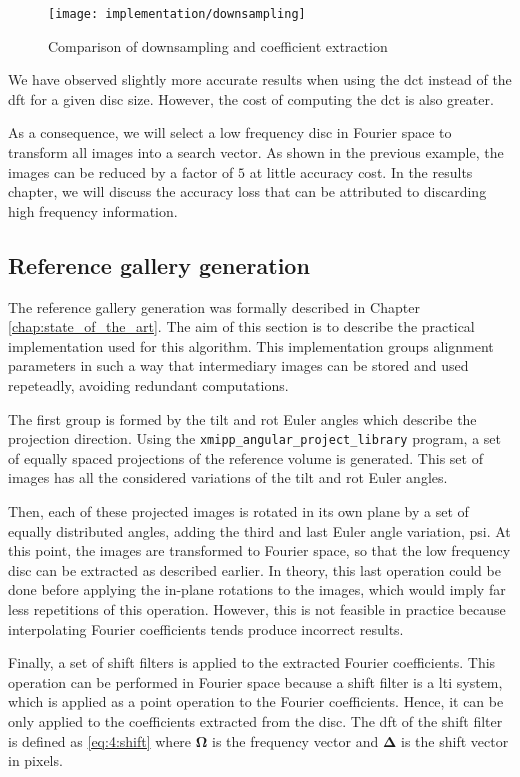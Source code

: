 \documentclass[../main.tex]{subfiles}
\begin{document}
\begin{figure}[htbp]
    \centering
    \texttt{[image: implementation/downsampling]}
    \caption{Comparison of downsampling and coefficient extraction}
    \label{fig:4:downsampling}
\end{figure}

We have observed slightly more accurate results when using the \gls{dct} instead of the \gls{dft} for a given disc size. However, the cost of computing the \gls{dct} is also greater.

As a consequence, we will select a low frequency disc in Fourier space to transform all images into a search vector. As shown in the previous example, the images can be reduced by a factor of $5$ at little accuracy cost. In the results chapter, we will discuss the accuracy loss that can be attributed to discarding high frequency information.

\subsection{Reference gallery generation}
The reference gallery generation was formally described in Chapter \ref{chap:state_of_the_art}. The aim of this section is to describe the practical implementation used for this algorithm. This implementation groups alignment parameters in such a way that intermediary images can be stored and used repeteadly, avoiding redundant computations.

The first group is formed by the tilt and rot Euler angles which describe the projection direction. Using the \texttt{xmipp\_angular\_project\_library}\cite{sorzano2004} program, a set of equally spaced projections of the reference volume is generated. This set of images has all the considered variations of the tilt and rot Euler angles.

Then, each of these projected images is rotated in its own plane by a set of equally distributed angles, adding the third and last Euler angle variation, psi. At this point, the images are transformed to Fourier space, so that the low frequency disc can be extracted as described earlier. In theory, this last operation could be done before applying the in-plane rotations to the images, which would imply far less repetitions of this operation. However, this is not feasible in practice because interpolating Fourier coefficients tends produce incorrect results.

Finally, a set of shift filters is applied to the extracted Fourier coefficients. This operation can be performed in Fourier space because a shift filter is a \gls{lti} system, which is applied as a point operation to the Fourier coefficients. Hence, it can be only applied to the coefficients extracted from the disc. The \gls{dft} of the shift filter is defined as \eqref{eq:4:shift} where $\bm{\Omega}$ is the frequency vector and $\bm{\Delta}$ is the shift vector in pixels.
\end{document}
